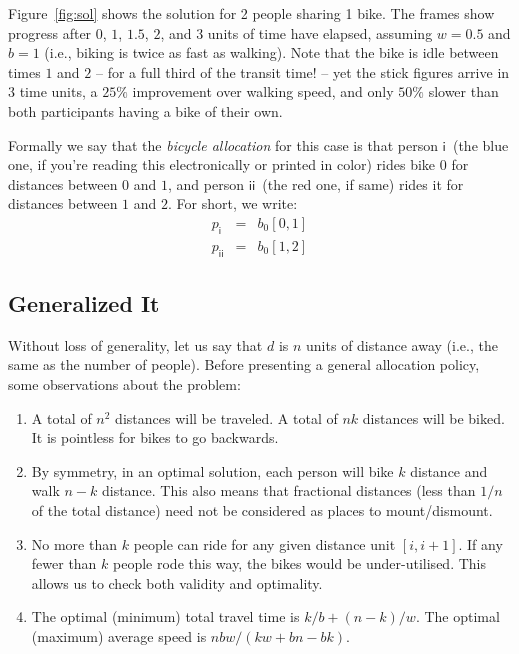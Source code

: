 \documentclass[DIV=calc, paper=a4, fontsize=11pt, twocolumn]{scrartcl}	 %
\begin{document}
Figure~\ref{fig:sol} shows the solution for 2 people sharing 1 bike.
The frames show progress after $0$, $1$, $1.5$, $2$, and $3$ units of time have elapsed, assuming $w=0.5$ and $b=1$ (i.e., biking is twice as fast as walking).
Note that the bike is idle between times $1$ and $2$ -- for a full third of the transit time! -- yet the stick figures arrive in $3$ time units, a $25\%$ improvement over walking speed, and only $50\%$ slower than both participants having a bike of their own.

\newcommand\PA{\ensuremath{\mathsf{i}}}
\newcommand\PB{\ensuremath{\mathsf{ii}}}
\newcommand\PC{\ensuremath{\mathsf{iii}}}
\newcommand\PD{\ensuremath{\mathsf{iv}}}
\newcommand\PE{\ensuremath{\mathsf{v}}}
Formally we say that the {\em bicycle allocation} for this case is that person \PA~(the blue one, if you're reading this electronically or printed in color) rides bike $0$ for distances between $0$ and $1$, and person \PB~(the red one, if same) rides it for distances between $1$ and $2$. For short, we write:
\begin{eqnarray*}
	p_\PA &=& b_0[0,1] \\
	p_\PB &=& b_0[1,2]
\end{eqnarray*}

\subsection{Generalized It}

Without loss of generality, let us say that $d$ is $n$ units of distance away (i.e., the same as the number of people).
Before presenting a general allocation policy, some observations about the problem:
\begin{enumerate}
	\setlength{\itemsep}{-0.5em}
	\item A total of $n^2$ distances will be traveled. A total of $nk$ distances will be biked. It is pointless for bikes to go backwards.
	\item By symmetry, in an optimal solution, each person will bike $k$ distance and walk $n-k$ distance. This also means that fractional distances (less than $1/n$ of the total distance) need not be considered as places to mount/dismount.
	\item No more than $k$ people can ride for any given distance unit $[i,i+1]$. If any fewer than $k$ people rode this way, the bikes would be under-utilised. This allows us to check both validity and optimality.
	\item The optimal (minimum) total travel time is $k/b + (n-k)/w$. The optimal (maximum) average speed is $nbw/(kw+bn-bk)$.
\end{enumerate}
\end{document}

